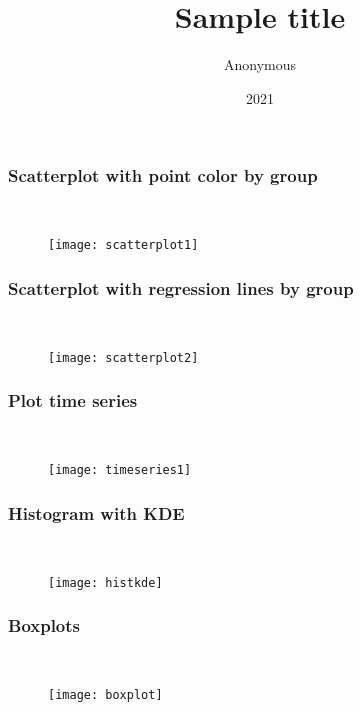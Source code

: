 \documentclass[border=5mm, convert, usenames, dvipsnames,beamer]{standalone}
\title{Sample title}
\author{Anonymous}
\institute{Overleaf}
\date{2021}
\begin{document}
\begin{frame}[ fragile]{}
\frametitle{Scatterplot with point color by group}

\

\vspace{1mm}
\noindent
\begin{figure}[h!]
\begin{center}
\texttt{[image: scatterplot1]}
\caption{}
\end{center}
\end{figure}
\end{frame}



\begin{frame}[ fragile]{}
\frametitle{Scatterplot with regression lines by group}

\

\vspace{1mm}
\noindent
\begin{figure}[h!]
\begin{center}
\texttt{[image: scatterplot2]}
\caption{}
\end{center}
\end{figure}
\end{frame}





\begin{frame}[ fragile]{}
\frametitle{Plot time series}

\

\vspace{1mm}
\noindent
\begin{figure}[h!]
\begin{center}
\texttt{[image: timeseries1]}
\caption{}
\end{center}
\end{figure}
\end{frame}




\begin{frame}[ fragile]{}
\frametitle{Histogram with KDE}

\

\vspace{1mm}
\noindent
\begin{figure}[h!]
\begin{center}
\texttt{[image: histkde]}
\caption{}
\end{center}
\end{figure}
\end{frame}



\begin{frame}[ fragile]{}
\frametitle{Boxplots}

\

\vspace{5mm}
\noindent
\begin{figure}[h!]
\begin{center}
\texttt{[image: boxplot]}
\caption{}
\end{center}
\end{figure}
\end{frame}
\end{document}
